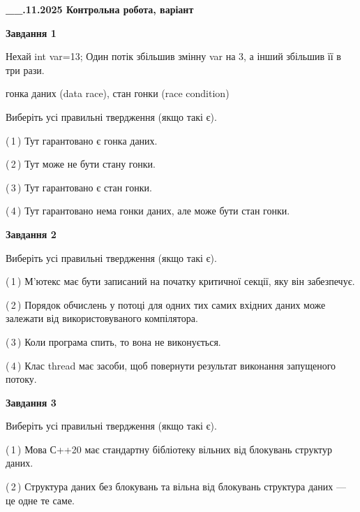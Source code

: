 \documentclass[12pt, ukrainian]{article}
\begin{document}
\begin {large}

\textbf{\_\_.11.2025 Контрольна робота, варіант  }\par


{

\begin{center}
\textbf{Завдання 1}
\end{center}
Нехай int var=13; Один потік збільшив змінну var на 3, а інший збільшив її в три рази.

гонка даних (data race), стан гонки (race condition)

Виберіть усі правильні твердження (якщо такі є).\par
\vspace{2mm}
(\,1\,) Тут гарантовано є гонка даних.%

(\,2\,) Тут може не бути стану гонки.%

(\,3\,) Тут гарантовано є стан гонки.%

(\,4\,) Тут гарантовано нема гонки даних, але може бути стан гонки.%



\begin{center}
\textbf{Завдання 2}
\end{center}
Виберіть усі правильні твердження (якщо такі є).\par
\vspace{2mm}

(\,1\,) М’ютекс має бути записаний на початку критичної секції, яку він забезпечує.%

(\,2\,) Порядок обчислень у потоці для одних тих самих вхідних даних може залежати від використовуваного компілятора.%

(\,3\,) Коли програма спить, то вона не виконується.%

(\,4\,) Клас thread має засоби, щоб повернути результат виконання запущеного потоку.%



\begin{center}
\textbf{Завдання 3}
\end{center}
Виберіть усі правильні твердження (якщо такі є).\par
\vspace{2mm}

(\,1\,) Мова С++20 має стандартну бібліотеку вільних від блокувань структур даних.%

(\,2\,) Структура даних без блокувань та вільна від блокувань структура даних --- це одне те саме.%

}
\end{large}
\end{document}
